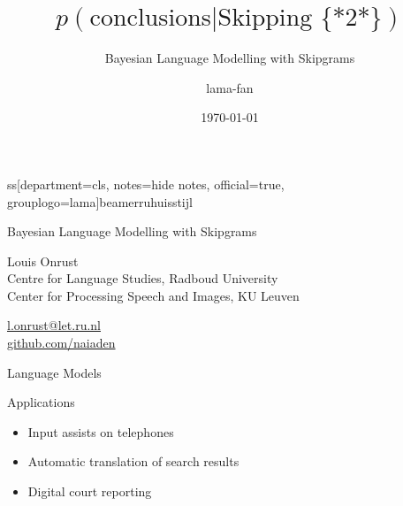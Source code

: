 ss[department=cls, notes={hide notes}, official=true, grouplogo=lama]{beamerruhuisstijl}

\title{$p(\text{conclusions} | \text{Skipping \{*2*\}})$}
\subtitle{Bayesian Language Modelling with Skipgrams}
\date{\today}
\author{lama-fan}

\usepackage{cleveref}

\usepackage{tikz}
\usepackage{tkz-graph}

\usepackage{pgfplots}
\usepackage{pgfplotstable}
\pgfplotsset{compat=1.10}



\begin{frame}
    \titlepage
\end{frame}
\note{

}

\begin{frame}{Bayesian Language Modelling with Skipgrams}
    \begin{block}{}
        Louis Onrust \\
        Centre for Language Studies, Radboud University \\
        Center for Processing Speech and Images, KU Leuven
    \end{block}

    \begin{block}{}
        \href{mailto:l.onrust@let.ru.nl}{l.onrust@let.ru.nl} \\
        \href{https://github.com/naiaden}{github.com/naiaden}
    \end{block}
\end{frame}
\note[itemize]{
}

\begin{frame}{Language Models}
    \begin{block}{Applications}
        \begin{itemize}
            \item Input assists on telephones
            \item Automatic translation of search results
            \item Digital court reporting
        \end{itemize}
    \end{block}
    
\end{frame}
\note{

}

